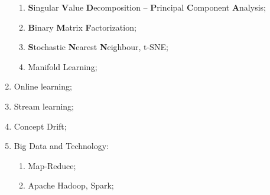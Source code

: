 \documentclass[a4paper]{article}
\begin{document}
\begin{enumerate}
\begin{enumerate}
    \item \textbf{S}ingular \textbf{V}alue \textbf{D}ecomposition -- \textbf{P}rincipal \textbf{C}omponent \textbf{A}nalysis;
    \item \textbf{B}inary \textbf{M}atrix \textbf{F}actorization;
    \item \textbf{S}tochastic \textbf{N}earest \textbf{N}eighbour, t-SNE;
    \item Manifold Learning;
  \end{enumerate}
  \item Online learning;
  \item Stream learning;
  \item Concept Drift;
	\item Big Data and Technology: \begin{enumerate}
		\item Map-Reduce;
		\item Apache Hadoop, Spark;
	\end{enumerate}
\end{enumerate}
\end{document}
